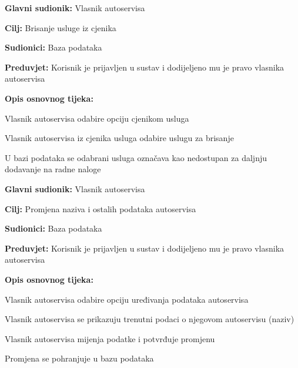 \noindent {}
\begin{packed_item}
	
	\item \textbf{Glavni sudionik: } Vlasnik autoservisa
	\item  \textbf{Cilj:} Brisanje usluge iz cjenika
	\item  \textbf{Sudionici:} Baza podataka
	\item  \textbf{Preduvjet:} Korisnik je prijavljen u sustav i dodijeljeno
	mu je pravo vlasnika autoservisa
	\item  \textbf{Opis osnovnog tijeka:}
	
	\item[] \begin{packed_enum}
		
		\item Vlasnik autoservisa odabire opciju cjenikom usluga
		\item Vlasnik autoservisa iz cjenika usluga odabire uslugu za brisanje
		\item U bazi podataka se odabrani usluga označava kao nedostupan za daljnju
		dodavanje na radne naloge
		
	\end{packed_enum}
\end{packed_item}



\noindent {}
\begin{packed_item}

	\item \textbf{Glavni sudionik: } Vlasnik autoservisa
	\item  \textbf{Cilj:} Promjena naziva i ostalih podataka autoservisa
	\item  \textbf{Sudionici:} Baza podataka
	\item  \textbf{Preduvjet:} Korisnik je prijavljen u sustav i dodijeljeno
	mu je pravo vlasnika autoservisa
	\item  \textbf{Opis osnovnog tijeka:}

	\item[] \begin{packed_enum}

		\item Vlasnik autoservisa odabire opciju uređivanja podataka autoservisa
		\item Vlasnik autoservisa se prikazuju trenutni podaci o njegovom
		autoservisu (naziv)
		\item Vlasnik autoservisa mijenja podatke i potvrđuje promjenu
		\item Promjena se pohranjuje u bazu podataka

	\end{packed_enum}
\end{packed_item}


